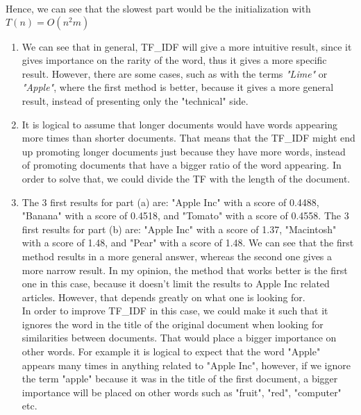 \documentclass[12pt,twoside]{article}
\begin{document}
\begin{problems}
\begin{problemparts}
Hence, we can see that the slowest part would be the initialization with
$T(n)=O(n^2m)$
\problempart 
\begin{enumerate}
\item
We can see that in general, TF\_IDF will give a more intuitive result, since it gives importance on the rarity of the word, thus it gives a more specific result. However, there are some cases, such as with the terms \emph{"Lime"} or \emph{"Apple"}, where the first method is better, because it gives a more general result, instead of presenting only the "technical" side.
\item
It is logical to assume that longer documents would have words appearing more times than shorter documents. That means that the TF\_IDF might end up promoting longer documents just because they have more words, instead of promoting documents that have a bigger ratio of the word appearing. In order to solve that, we could divide the TF with the length of the document. 
\item
The 3 first results for part (a) are: "Apple Inc" with a score of 0.4488, "Banana" with a score of 0.4518, and "Tomato" with a score of 0.4558. The 3 first results for part (b) are: "Apple Inc" with a score of 1.37, "Macintosh" with a score of 1.48, and "Pear" with a score of 1.48. We can see that the first method results in a more general answer, whereas the second one gives a more narrow result. In my opinion, the method that works better is the first one in this case, because it doesn't limit the results to Apple Inc related articles. However, that depends greatly on what one is looking for. \\ In order to improve TF\_IDF in this case, we could make it such that it ignores the word in the title of the original document when looking for similarities between documents. That would place a bigger importance on other words. For example it is logical to expect that the word "Apple" appears many times in anything related to "Apple Inc", however, if we ignore the term "apple" because it was in the title of the first document, a bigger importance will be placed on other words such as "fruit", "red", "computer" etc.

\end{enumerate}
\end{problemparts}

\end{problems}
\end{document}
